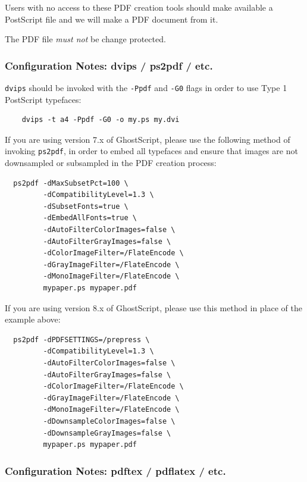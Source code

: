 \documentclass{egpubl}
\begin{document}
Users with no access to these PDF creation tools should make available a
PostScript file and we will make a PDF document from it.


The PDF file \emph{must not} be change protected.

\subsubsection*{Configuration Notes: dvips / ps2pdf / etc.}

\noindent
\texttt{dvips} should be invoked with the \texttt{-Ppdf} and \texttt{-G0}
flags in order to use Type 1 PostScript typefaces:

\begin{verbatim}
    dvips -t a4 -Ppdf -G0 -o my.ps my.dvi
\end{verbatim}


\noindent
If you are using version 7.x of GhostScript, please use the following method of invoking \texttt{ps2pdf}, in
order to embed all typefaces and ensure that images are not downsampled or subsampled in the PDF
creation process:

\begin{verbatim}
  ps2pdf -dMaxSubsetPct=100 \
         -dCompatibilityLevel=1.3 \
         -dSubsetFonts=true \
         -dEmbedAllFonts=true \
         -dAutoFilterColorImages=false \
         -dAutoFilterGrayImages=false \
         -dColorImageFilter=/FlateEncode \
         -dGrayImageFilter=/FlateEncode \
         -dMonoImageFilter=/FlateEncode \
         mypaper.ps mypaper.pdf
\end{verbatim}


If you are using version 8.x of GhostScript, please use this method in place of the example above:
\begin{verbatim}
  ps2pdf -dPDFSETTINGS=/prepress \
         -dCompatibilityLevel=1.3 \
         -dAutoFilterColorImages=false \
         -dAutoFilterGrayImages=false \
         -dColorImageFilter=/FlateEncode \
         -dGrayImageFilter=/FlateEncode \
         -dMonoImageFilter=/FlateEncode \
         -dDownsampleColorImages=false \
         -dDownsampleGrayImages=false \
         mypaper.ps mypaper.pdf
\end{verbatim}

\subsubsection*{Configuration Notes: pdftex / pdflatex / etc.}
\end{document}

